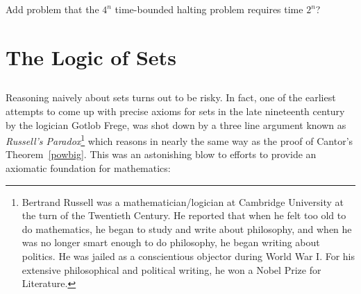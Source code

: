 \begin{problems}

\classproblems
{}

\homeworkproblems
{}

\begin{editingnotes}
Add problem that the $4^n$ time-bounded halting problem requires time
$2^n$?
\end{editingnotes}

\end{problems}

\section{The Logic of Sets}\label{set_logic_sec}%

\subsection{}

Reasoning naively about sets turns out to be risky.  In fact, one of the
earliest attempts to come up with precise axioms for sets in the late
nineteenth century by the logician  Gotlob Frege, was
shot down by a three line argument known as \emph{Russell's
  Paradox}\footnote{Bertrand Russell%
was a mathematician/logician at Cambridge University at the turn of the Twentieth
 Century.  He reported that when he felt too old to do mathematics, he began to study
  and write about philosophy, and when he was no longer smart enough to do
  philosophy, he began writing about politics.  He was jailed as a
  conscientious objector during World War I.  For his extensive
  philosophical and political writing, he won a Nobel Prize for
  Literature.} which reasons in nearly the same way as the proof of
Cantor's Theorem~\ref{powbig}.  This was an astonishing blow to efforts to
provide an axiomatic foundation for mathematics:


